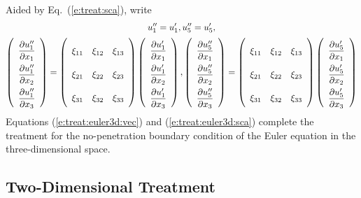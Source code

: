 \documentclass[a4paper,12pt,dvips]{article}
\begin{document}
%
Aided by Eq.~(\ref{e:treat:sca}), write
\begin{gather}
  u''_1 = u'_1, u''_5 = u'_5,
  \label{e:treat:euler3d:sca}
  \\
  \renewcommand{\arraystretch}{2.2}
  \left(\begin{array}{c}
    \dfrac{\partial u''_1}{\partial x_1} \\
    \dfrac{\partial u''_1}{\partial x_2} \\
    \dfrac{\partial u''_1}{\partial x_3}
  \end{array}\right)
  = \left(\begin{array}{ccc}
    \xi_{11} & \xi_{12} & \xi_{13} \\
    \xi_{21} & \xi_{22} & \xi_{23} \\
    \xi_{31} & \xi_{32} & \xi_{33}
  \end{array}\right)
  \left(\begin{array}{c}
    \dfrac{\partial u'_1}{\partial x_1} \\
    \dfrac{\partial u'_1}{\partial x_2} \\
    \dfrac{\partial u'_1}{\partial x_3}
  \end{array}\right),
  \left(\begin{array}{c}
    \dfrac{\partial u''_5}{\partial x_1} \\
    \dfrac{\partial u''_5}{\partial x_2} \\
    \dfrac{\partial u''_5}{\partial x_3}
  \end{array}\right)
  = \left(\begin{array}{ccc}
    \xi_{11} & \xi_{12} & \xi_{13} \\
    \xi_{21} & \xi_{22} & \xi_{23} \\
    \xi_{31} & \xi_{32} & \xi_{33}
  \end{array}\right)
  \left(\begin{array}{c}
    \dfrac{\partial u'_5}{\partial x_1} \\
    \dfrac{\partial u'_5}{\partial x_2} \\
    \dfrac{\partial u'_5}{\partial x_3}
  \end{array}\right)
  \notag
\end{gather}
%
Equations (\ref{e:treat:euler3d:vec}) and (\ref{e:treat:euler3d:sca}) complete
the treatment for the no-penetration boundary condition of the Euler equation
in the three-dimensional space.

\subsection{Two-Dimensional Treatment}
\end{document}
